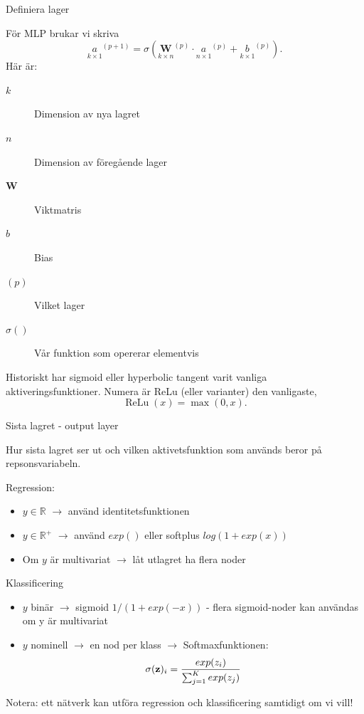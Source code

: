 \documentclass[10pt,english]{beamer}
\begin{document}
\begin{frame}{Definiera lager}
    
    För MLP brukar vi skriva
    \begin{equation*}
        \underset{k \times 1}{a}^{(p+1)} = \sigma \left( \underset{k \times n}{\mathbf{W}}^{(p)} \cdot \underset{n \times 1}{a}^{(p)} + \underset{k \times 1}{b}^{(p)} \right).
    \end{equation*}
    Här är:
    \begin{description}
        \item[$k$] Dimension av nya lagret
        \item[$n$] Dimension av föregående lager
        \item[$\mathbf{W}$] Viktmatris
        \item[$b$] Bias
        \item[$(p)$] Vilket lager
        \item[$\sigma()$] Vår funktion som opererar elementvis   
    \end{description}
    Historiskt har sigmoid eller hyperbolic tangent varit vanliga aktiveringsfunktioner. Numera är ReLu (eller varianter) den vanligaste,
    \begin{equation*}
        \operatorname{ReLu}(x) = \max(0,x).
    \end{equation*}
\end{frame}


\begin{frame}{Sista lagret - output layer}
    
    Hur sista lagret ser ut och vilken aktivetsfunktion som används beror på repsonsvariabeln.
    
    Regression:
    \begin{itemize}
        \item $y\in \mathbb{R}$ $\rightarrow$ använd identitetsfunktionen
        \item $y\in \mathbb{R}^+$ $\rightarrow$ använd $exp()$ eller softplus $log(1+exp(x))$
        \item Om $y$ är multivariat $\rightarrow$  låt utlagret ha flera noder
    \end{itemize}
    
    Klassificering
    \begin{itemize}
        \item $y$ binär $\rightarrow$ sigmoid $1 / (1+exp(-x))$ - flera sigmoid-noder kan användas om y är multivariat
        \item $y$ nominell $\rightarrow$ en nod per klass $\rightarrow$ Softmaxfunktionen:
          \begin{equation*}
            \sigma(\bold{z})_i = \frac{exp(z_i)}{\sum_{j=1}^{K}exp(z_j)}
          \end{equation*}
    \end{itemize}
    
    Notera: ett nätverk kan utföra regression och klassificering samtidigt om vi vill!
    
\end{frame}
\end{document}
